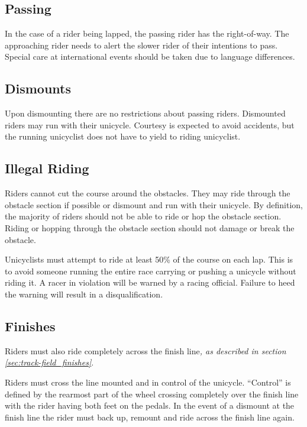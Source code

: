 \subsection{Passing}

In the case of a rider being lapped, the passing rider has the right-of-way.
The approaching rider needs to alert the slower rider of their intentions to pass.
Special care at international events should be taken due to language differences.

\subsection{Dismounts}

Upon dismounting there are no restrictions about passing riders.
Dismounted riders may run with their unicycle.
Courtesy is expected to avoid accidents, but the running unicyclist does not have to yield to riding unicyclist.

\subsection{Illegal Riding}

Riders cannot cut the course around the obstacles.
They may ride through the obstacle section if possible or dismount and run with their unicycle.
By definition, the majority of riders should not be able to ride or hop the obstacle section.
Riding or hopping through the obstacle section should not damage or break the obstacle.

Unicyclists must attempt to ride at least 50\% of the course on each lap.
This is to avoid someone running the entire race carrying or pushing a unicycle without riding it. 
A racer in violation will be warned by a racing official.
Failure to heed the warning will result in a disqualification.

\subsection{Finishes}

Riders must also ride completely across the finish line\textit{, as described in section \ref{sec:track-field_finishes}}. 

Riders must cross the line mounted and in control of the unicycle.
``Control'' is defined by the rearmost part of the wheel crossing completely over the finish line with the rider having both feet on the pedals.
In the event of a dismount at the finish line the rider must back up, remount and ride across the finish line again.
